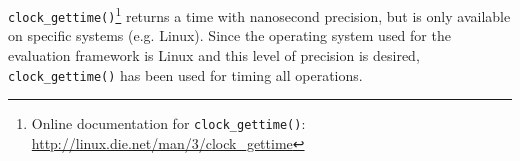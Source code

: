 \texttt{clock\_gettime()}\footnote{Online documentation for \texttt{clock\_gettime()}: \url{http://linux.die.net/man/3/clock_gettime}} returns a time with nanosecond precision, but is only available on specific systems (e.g. Linux). Since the operating system used for the evaluation framework is Linux and this level of precision is desired, \texttt{clock\_gettime()} has been used for timing all operations.